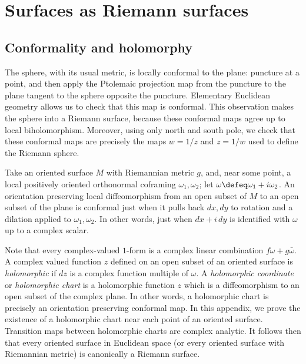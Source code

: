 \chapter{Surfaces as Riemann surfaces}\label{chapter:Riemann.surfaces}%


\section{Conformality and holomorphy}
\begin{example}
The sphere, with its usual metric, is locally conformal to the plane: puncture at a point, and then apply the Ptolemaic projection map from the puncture to the plane tangent to the sphere opposite the puncture.
Elementary Euclidean geometry allows us to check that this map is conformal.
This observation makes the sphere into a Riemann surface, because these conformal maps agree up to local biholomorphism.
Moreover, using only north and south pole, we check that these conformal maps are precisely the maps \(w=1/z\) and \(z=1/w\) used to define the Riemann sphere.
\end{example}
Take an oriented surface \(M\) with Riemannian metric \(g\), and, near some point, a local positively oriented orthonormal coframing \(\omega_1,\omega_2\); let \(\omega\defeq\omega_1+i\omega_2\).
An orientation preserving local diffeomorphism from an open subset of \(M\) to an open subset of the plane is conformal just when it pulls back \(dx,dy\) to rotation and a dilation applied to \(\omega_1,\omega_2\).
In other words, just when \(dx+i \, dy\) is identified with \(\omega\) up to a complex scalar.

Note that every complex-valued \(1\)-form is a complex linear combination \(f\omega+g\bar\omega\).
A complex valued function \(z\) defined on an open subset of an oriented surface is \emph{holomorphic} if \(dz\) is a complex function multiple of \(\omega\).
A \emph{holomorphic coordinate} or \emph{holomorphic chart} is a holomorphic function \(z\) which is a diffeomorphism to an open subset of the complex plane.
In other words, a holomorphic chart is precisely an orientation preserving conformal map.
In this appendix, we prove the existence of a holomorphic chart near each point of an oriented surface.
Transition maps between holomorphic charts are complex analytic.
It follows then that every oriented surface in Euclidean space (or every oriented surface with Riemannian metric) is canonically a Riemann surface.

